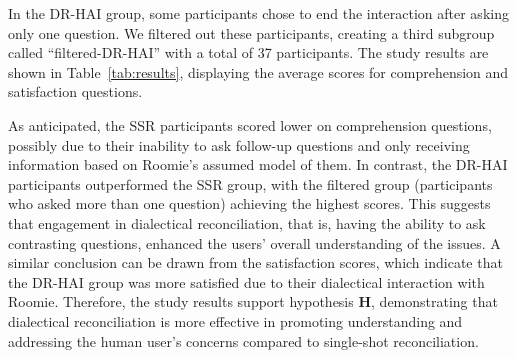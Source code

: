 \documentclass{ecai}
\begin{document}
In the DR-HAI group, some participants chose to end the interaction after asking only one question. We filtered out these participants, creating a third subgroup called ``filtered-DR-HAI'' with a total of 37 participants. The study results are shown in Table~\ref{tab:results}, displaying the average scores for comprehension and satisfaction questions. 


\begin{table}
\centering
{}
\caption{Results of the user study.}
\label{tab:results}
\end{table}



As anticipated, the SSR participants scored lower on comprehension questions, possibly due to their inability to ask follow-up questions and only receiving information based on Roomie's assumed model of them. In contrast, the DR-HAI participants outperformed the SSR group, with the filtered group (participants who asked more than one question) achieving the highest scores. This suggests that engagement in dialectical reconciliation, that is, having the ability to ask contrasting questions, enhanced the users' overall understanding of the issues. A similar conclusion can be drawn from the satisfaction scores, which indicate that the DR-HAI group was more satisfied due to their dialectical interaction with Roomie. Therefore, the study results support hypothesis \textbf{H}, demonstrating that dialectical reconciliation is more effective in promoting understanding and addressing the human user's concerns compared to single-shot reconciliation.
\end{document}

